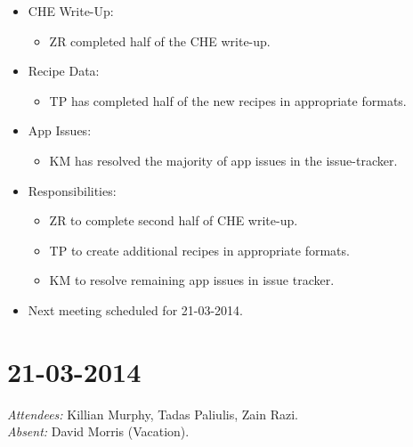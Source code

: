 \documentclass{article}
\begin{document}
\begin{itemize}
\item CHE Write-Up:
  \begin{itemize}
  \item ZR completed half of the CHE write-up.
  \end{itemize}
\item Recipe Data:
  \begin{itemize}
  \item TP has completed half of the new recipes in appropriate formats.
  \end{itemize}
\item App Issues:
  \begin{itemize}
  \item KM has resolved the majority of app issues in the issue-tracker.
  \end{itemize}
\item Responsibilities:
  \begin{itemize}
  \item ZR to complete second half of CHE write-up.
  \item TP to create additional recipes in appropriate formats.
  \item KM to resolve remaining app issues in issue tracker.
  \end{itemize}
\item Next meeting scheduled for 21-03-2014.
\end{itemize}

\clearpage

\section*{21-03-2014}
\vspace{0.5cm}
\emph{Attendees: }Killian Murphy, Tadas Paliulis, Zain Razi.
\\
\emph{Absent: }David Morris (Vacation).
\end{document}

